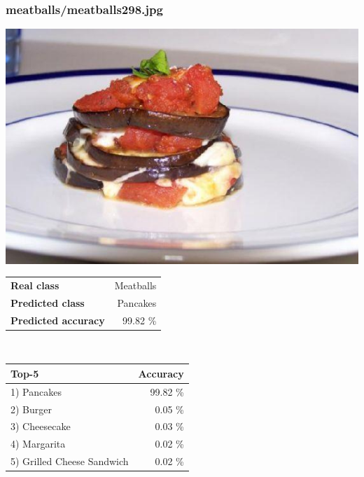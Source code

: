 \subsubsection{meatballs/meatballs298.jpg}

\begin{minipage}[t]{0.4\textwidth}
	\vspace{0pt}
	\includegraphics[width=\linewidth]{images/evaluation-images/meatballs/meatballs298.jpg}
\end{minipage}
\hfill
\begin{minipage}[t]{0.5\textwidth}
	\vspace{0pt}\raggedright
	\begin{tabularx}{\textwidth}{X r}
		\small \textbf{Real class} & \small Meatballs\\
		\small \textbf{Predicted class} & \small Pancakes\\
		\small \textbf{Predicted accuracy} & \small 99.82 \%
    \end{tabularx}\\
    
    \vspace{6pt}
	\begin{tabularx}{\textwidth}{X r}
        \small \textbf{Top-5} & \small \textbf{Accuracy} \\
        \hline
		\small 1) Pancakes & \small 99.82 \%\\\small 2) Burger & \small 0.05 \%\\\small 3) Cheesecake & \small 0.03 \%\\\small 4) Margarita & \small 0.02 \%\\\small 5) Grilled Cheese Sandwich & \small 0.02 \%
    \end{tabularx}
\end{minipage}
    

